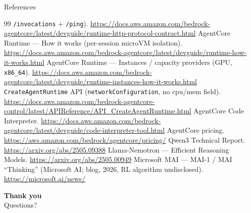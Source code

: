 \documentclass[aspectratio=169]{beamer}
\begin{document}
\begin{frame}[allowframebreaks]{References}
\begin{thebibliography}{99}
      \texttt{/invocations} + \texttt{/ping}).
      \url{https://docs.aws.amazon.com/bedrock-agentcore/latest/devguide/runtime-http-protocol-contract.html}
     AgentCore Runtime --- How it works (per-session microVM isolation).
      \url{https://docs.aws.amazon.com/bedrock-agentcore/latest/devguide/runtime-how-it-works.html}
     AgentCore Runtime --- Instances / capacity providers (GPU, \texttt{x86\_64}).
      \url{https://docs.aws.amazon.com/bedrock-agentcore/latest/devguide/runtime-instances-how-it-works.html}
     \texttt{CreateAgentRuntime} API (\texttt{networkConfiguration}, no cpu/mem field).
      \url{https://docs.aws.amazon.com/bedrock-agentcore-control/latest/APIReference/API_CreateAgentRuntime.html}
     AgentCore Code Interpreter.
      \url{https://docs.aws.amazon.com/bedrock-agentcore/latest/devguide/code-interpreter-tool.html}
     AgentCore pricing. \url{https://aws.amazon.com/bedrock/agentcore/pricing/}
     Qwen3 Technical Report. \url{https://arxiv.org/abs/2505.09388}
     Llama-Nemotron --- Efficient Reasoning Models.
      \url{https://arxiv.org/abs/2505.00949}
     Microsoft MAI --- MAI-1 / MAI ``Thinking'' (Microsoft AI; blog, 2026,
      RL algorithm undisclosed). \url{https://microsoft.ai/news/}
  \end{thebibliography}
\end{frame}

\begin{frame}
  \begin{center}
    {\Huge \textbf{Thank you}}\\[1em]
    {\large Questions?}
  \end{center}
\end{frame}
\end{document}
